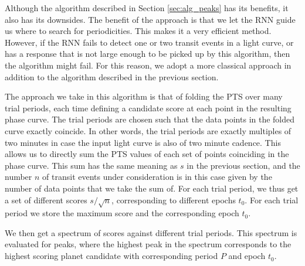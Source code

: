 Although the algorithm described in Section \ref{sec:alg_peaks} has its benefits, it also has its downsides. The benefit of the approach is that we let the RNN guide us where to search for periodicities. This makes it a very efficient method. However, if the RNN fails to detect one or two transit events in a light curve, or has a response that is not large enough to be picked up by this algorithm, then the algorithm might fail. For this reason, we adopt a more classical approach in addition to the algorithm described in the previous section. 

The approach we take in this algorithm is that of folding the PTS over many trial periods, each time defining a candidate score at each point in the resulting phase curve. The trial periods are chosen such that the data points in the folded curve exactly coincide. In other words, the trial periods are exactly multiples of two minutes in case the input light curve is also of two minute cadence. This allows us to directly sum the PTS values of each set of points coinciding in the phase curve. This sum has the same meaning as $s$ in the previous section, and the number $n$ of transit events under consideration is in this case given by the number of data points that we take the sum of. For each trial period, we thus get a set of different scores $s/\sqrt{n}$, corresponding to different epochs $t_0$. For each trial period we store the maximum score and the corresponding epoch $t_0$. 

We then get a spectrum of scores against different trial periods. This spectrum is evaluated for peaks, where the highest peak in the spectrum corresponds to the highest scoring planet candidate with corresponding period $P$ and epoch $t_0$.

